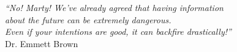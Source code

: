 \cleardoublepage
\thispagestyle{plain}

\vspace*{8cm}

\begin{flushright}
   \textsl{``No! Marty! We've already agreed that having information \\
     about the future can be extremely dangerous. \\
   Even if your intentions are good, it can backfire drastically!''} \\
\vspace*{1.5cm}
           Dr. Emmett Brown
\end{flushright}
